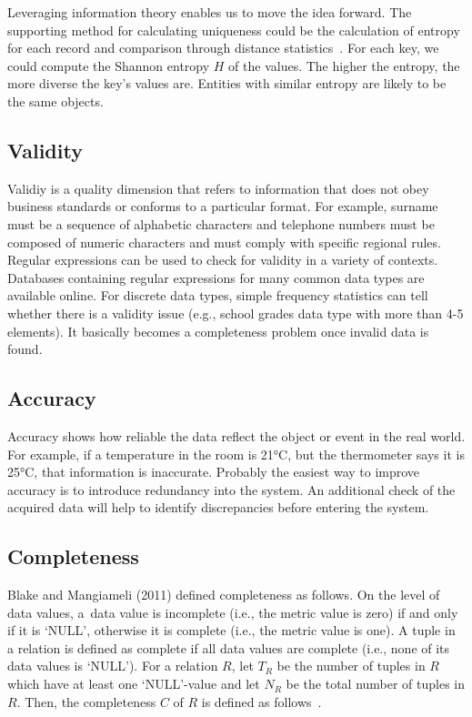 Leveraging information theory enables us to move the idea forward.
The supporting method for calculating uniqueness could be the calculation of entropy for each record and comparison through distance statistics~\cite{venkatesh2010}.
For each key, we could compute the Shannon entropy \( H \) of the values.
The higher the entropy, the more diverse the key's values are.
Entities with similar entropy are likely to be the same objects.

\subsection{Validity}

Validiy is a quality dimension that refers to information that does not obey business standards or conforms to a particular format.
For example, surname must be a sequence of alphabetic characters and telephone numbers must be composed of numeric characters and must comply with specific regional rules.
Regular expressions can be used to check for validity in a variety of contexts.
Databases containing regular expressions for many common data types are available online.
For discrete data types, simple frequency statistics can tell whether there is a validity issue (e.g., school grades data type with more than 4-5 elements).
It basically becomes a completeness problem once invalid data is found.

\subsection{Accuracy}

Accuracy shows how reliable the data reflect the object or event in the real world.
For example, if a temperature in the room is 21°C, but the thermometer says it is 25°C, that information is inaccurate.
Probably the easiest way to improve accuracy is to introduce redundancy into the system.
An additional check of the acquired data will help to identify discrepancies before entering the system.

\subsection{Completeness}

Blake and Mangiameli (2011) defined completeness as follows.
On the level of data values, a~data value is incomplete (i.e., the metric value is zero) if and only if it is \enquote*{NULL}, otherwise it is complete (i.e., the metric value is one).
A tuple in a relation is defined as complete if all data values are complete (i.e., none of its data values is \enquote*{NULL}).
For a relation \( R \), let \( T_R \) be the number of tuples in \( R \) which have at least one \enquote*{NULL}-value and let \( N_R \) be the total number of tuples in \( R \). Then, the completeness \( C \) of \( R \) is defined as follows~\cite{blake2011}.

